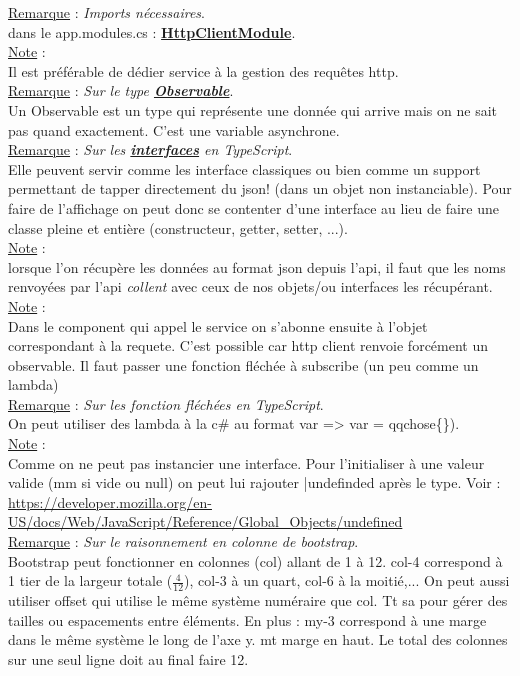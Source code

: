\documentclass[a4paper,12pt,twoside]{article}
\newcommand{\urlcolor}{magenta}  %
\newcommand{\keycolor}{purple} %
\newcommand{\incode}[1]{{\footnotesize\ttfamily #1}} %
\newcommand{\rem}[2]{\noindent\underline{Remarque} : \textit{#1}.\\ \indent #2}
\newcommand{\note}[1]{\noindent\underline{Note} : \\ \indent #1}
\newcommand{\keyref}[2]{\hypersetup{urlcolor=\keycolor} \href{#1}{\textbf{#2}}\hypersetup{urlcolor=\urlcolor}}
\begin{document}
\rem{Imports nécessaires}{dans le \incode{app.modules.cs} : \keyref{https://angular.io/api/common/http/HttpClient}{HttpClientModule}.}\\

\note{Il est préférable de dédier service à la gestion des requêtes http.}\\

\rem{Sur le type \keyref{https://angular.io/guide/observables}{Observable}}{Un Observable est un type qui représente une donnée qui arrive mais on ne sait pas quand exactement. C'est une variable asynchrone.}\\

\rem{Sur les \keyref{https://www.typescriptlang.org/docs/handbook/interfaces.html}{interfaces} en TypeScript}{Elle peuvent servir comme les interface classiques ou bien comme un support permettant de tapper directement du json! (dans un objet non instanciable). Pour faire de l'affichage on peut donc se contenter d'une interface au lieu de faire une classe pleine et entière (constructeur, getter, setter, ...).}\\

\note{lorsque l'on récupère les données au format json depuis l'api, il faut que les noms renvoyées par l'api \textit{collent} avec ceux de nos objets/ou interfaces les récupérant.}\\

\note{Dans le component qui appel le service on s'abonne ensuite à l'objet correspondant à la requete. C'est possible car http client renvoie forcément un observable. Il faut passer une fonction fléchée à subscribe (un peu comme un lambda)}\\

\rem{Sur les fonction fléchées en TypeScript}{On peut utiliser des lambda à la c\# au format \incode{var => var = qqchose\{\})}.}\\

\note{Comme on ne peut pas instancier une interface. Pour l'initialiser à une valeur valide (mm si vide ou null) on peut lui rajouter \incode{|undefinded} après le type. Voir : \url{https://developer.mozilla.org/en-US/docs/Web/JavaScript/Reference/Global_Objects/undefined}}\\

\rem{Sur le raisonnement en colonne de bootstrap}{Bootstrap peut fonctionner en colonnes (col) allant de 1 à 12. col-4 correspond à 1 tier de la largeur totale ($\frac{4}{12}$), col-3 à un quart, col-6 à la moitié,... On peut aussi utiliser offset qui utilise le même système numéraire que col. Tt sa pour gérer des tailles ou espacements entre éléments. En plus : my-3 correspond à une marge dans le même système le long de l'axe y. mt marge en haut. Le total des colonnes sur une seul ligne doit au final faire 12.}\\
\end{document}
